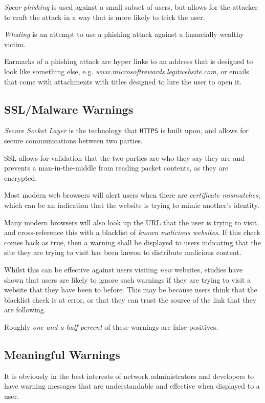 \documentclass{article}
\begin{document}
\textit{Spear phishing} is used against a small subset of users, but allows for the attacker to craft the attack in a way that is more likely to trick the user.

\textit{Whaling} is an attempt to use a phishing attack against a financially wealthy victim.

Earmarks of a phishing attack are hyper links to an address that is designed to look like something else, e.g. \textit{www.microsoftrewards.legitwebsite.com}, or emails that come with attachments with titles designed to lure the user to open it.

\subsection{SSL/Malware Warnings}

\textit{Secure Socket Layer} is the technology that \texttt{HTTPS} is built upon, and allows for secure communications between two parties.

SSL allows for validation that the two parties are who they say they are and prevents a man-in-the-middle from reading packet contents, as they are encrypted.

Most modern web browsers will alert users when there are \textit{certificate mismatches}, which can be an indication that the website is trying to mimic another's identity.

Many modern browsers will also look up the URL that the user is trying to visit, and cross-reference this with a blacklist of \textit{known malicious websites}. If this check comes back as true, then a warning shall be displayed to users indicating that the site they are trying to visit has been knwon to distribute malicious content.

Whilst this can be effective against users visiting \textit{new} websites, studies have shown that users are likely to ignore such warnings if they are trying to visit a website that they have been to before. This may be because users think that the blacklist check is at error, or that they can trust the source of the link that they are following.

Roughly \textit{one and a half percent} of these warnings are false-positives.

\subsection{Meaningful Warnings}

It is obviously in the best interests of network administrators and developers to have warning messages that are understandable and effective when displayed to a user.
\end{document}
